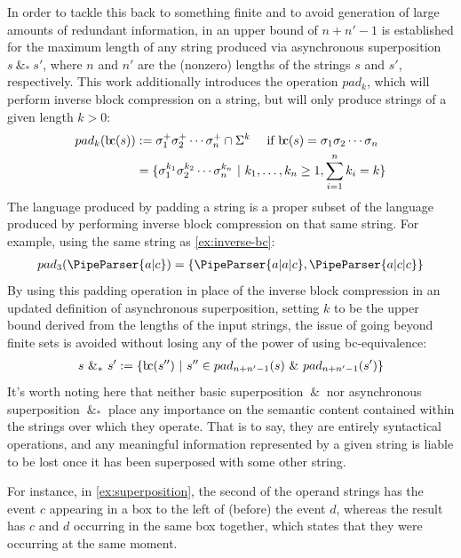 \documentclass[a4paper,12pt,leqno]{article}
\newcommand{\bc}{{\rm b\!c}}
\newcommand{\vph}[1]{\vphantom{#1}}
\newcommand{\ebox}[1]{\fbox{$\vph{'(),}#1$}}
\renewcommand{\sp}{~\&~}
\newcommand{\spasync}{~\&_*~}
\newcommand{\EventString}[1]{%
	\renewcommand*{\do}[1]{\ebox{##1}}%
	\PipeParser{#1}%
}
\begin{document}
In order to tackle this back to something finite and to avoid generation of large amounts of redundant information, in \citet[p. 127]{woods2017towards} an upper bound of $n + n' - 1$\label{def:sp-upper-bound-length} is established for the maximum length of any string produced via asynchronous superposition $s \spasync s'$, where $n$ and $n'$ are the (nonzero) lengths of the strings $s$ and $s'$, respectively. This work additionally introduces the operation $pad_k$, which will perform inverse block compression on a string, but will only produce strings of a given length $k > 0$:
\begin{align}\label{def:padk}
	pad_k(\bc(s)) &:= \sigma_1^+ \sigma_2^+ \cdots \sigma_n^+ \cap \Sigma^k ~~~ \mbox{ if } \bc(s) = \sigma_1 \sigma_2 \cdots \sigma_n\\
	&=\{\sigma_1^{k_1}\sigma_2^{k_2}\cdots\sigma_n^{k_n} ~|~ k_1,\ldots,k_n \ge 1, \sum_{i = 1}^{n}k_i = k  \}\notag
\end{align}
The language produced by padding a string is a proper subset of the language produced by performing inverse block compression on that same string. For example, using the same string as \cref{ex:inverse-bc}:
\begin{align}\label{ex:padk}
	pad_3(\EventString{a|c}) = \{\EventString{a|a|c}, \EventString{a|c|c}\}
\end{align}
By using this padding operation in place of the inverse block compression in an updated definition of asynchronous superposition, setting $k$ to be the upper bound derived from the lengths of the input strings, the issue of going beyond finite sets is avoided without losing any of the power of using \bc-equivalence:
\begin{align}\label{def:async-superposition}
	s \spasync s' := \{\bc(s'') ~|~ s'' \in pad_{n+n'-1}(s) \sp pad_{n+n'-1}(s')\}
\end{align}
It's worth noting here that neither basic superposition $\sp$ nor asynchronous superposition $\spasync$ place any importance on the semantic content contained within the strings over which they operate. That is to say, they are entirely syntactical operations, and any meaningful information represented by a given string is liable to be lost once it has been superposed with some other string.

For instance, in \cref{ex:superposition}, the second of the operand strings has the event $c$ appearing in a box to the left of (before) the event $d$, whereas the result has $c$ and $d$ occurring in the same box together, which states that they were occurring at the same moment.
\end{document}
